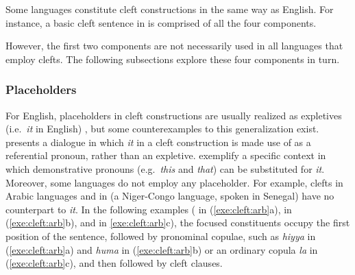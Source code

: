 \noindent Some languages constitute cleft constructions in the same
way as English.  For instance, a basic cleft sentence
 in  is comprised of all the four
components.


\noindent However, the first two components are not necessarily used
in all languages that employ clefts. The following subsections explore
these four components in turn.



\subsubsection{Placeholders}
\label{10:sssec:clefts:placeholders}


For English, placeholders in cleft constructions are
usually realized as expletives (i.e.\ \textit{it} in English)
\citep{pollard:sag:94}, but some counterexamples to this
generalization exist. \citet{kim:12a} presents a dialogue in which
\textit{it} in a cleft construction is made use of as a referential
pronoun, rather than an expletive. \citet{ han:hedberg:08} exemplify a
specific context in which demonstrative pronouns (e.g.\ \textit{this}
and \textit{that}) can be substituted for \textit{it}. Moreover, some
languages do not employ any placeholder. For example, clefts in Arabic
languages and in  (a Niger-Congo language, spoken in
Senegal) have no counterpart to \textit{it}. In the following examples
( in (\ref{exe:cleft:arb}a),  in (\ref{exe:cleft:arb}b), and  in
\ref{exe:cleft:arb}c), the focused constituents occupy the first
position of the sentence, followed by pronominal copulae, such as
\textit{hiyya} in (\ref{exe:cleft:arb}a) and \textit{huma} in
(\ref{exe:cleft:arb}b) or an ordinary copula \textit{la} in
(\ref{exe:cleft:arb}c), and then followed by cleft clauses.




